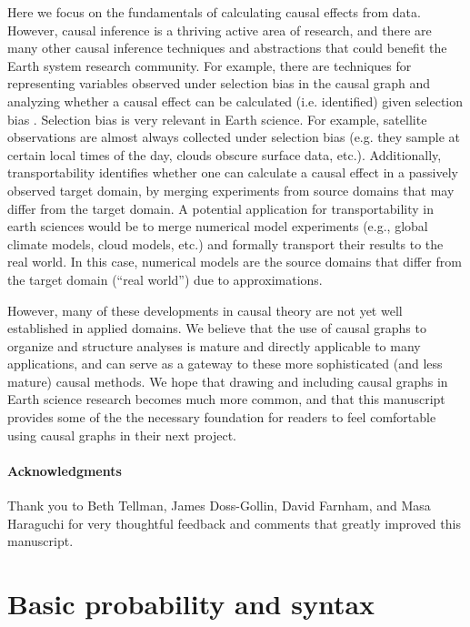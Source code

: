 \documentclass[12pt]{article}
\begin{document}
Here we focus on the fundamentals of calculating causal effects from
data. However, causal inference is a thriving active area of research,
and there are many other causal inference techniques and abstractions
that could benefit the Earth system research community. For example,
there are techniques for representing variables observed under
selection bias in the causal graph and analyzing whether a causal
effect can be calculated (i.e. identified) given selection bias
\citep[e.g.,][]{bareinboim2014recovering}. Selection bias is very
relevant in Earth science. For example, satellite observations are
almost always collected under selection bias (e.g. they sample at
certain local times of the day, clouds obscure surface data,
etc.). Additionally, transportability
\citep[e.g.,][]{bareinboim2012transportability} identifies whether one
can calculate a causal effect in a passively observed target domain,
by merging experiments from source domains that may differ from the
target domain. A potential application for transportability in earth
sciences would be to merge numerical model experiments (e.g., global
climate models, cloud models, etc.) and formally transport their
results to the real world. In this case, numerical models are the
source domains that differ from the target domain (``real world'') due
to approximations.

However, many of these developments in causal theory are not yet well
established in applied domains. We believe that the use of causal
graphs to organize and structure analyses is mature and directly
applicable to many applications, and can serve as a gateway to these
more sophisticated (and less mature) causal methods. We hope that
drawing and including causal graphs in Earth science research becomes
much more common, and that this manuscript provides some of the the
necessary foundation for readers to feel comfortable using causal
graphs in their next project.

\paragraph{Acknowledgments} Thank you to Beth Tellman, James
Doss-Gollin, David Farnham, and Masa Haraguchi for very thoughtful
feedback and comments that greatly improved this manuscript.




\appendix
\section{Basic probability and syntax}
\label{prob-theory}
\end{document}
